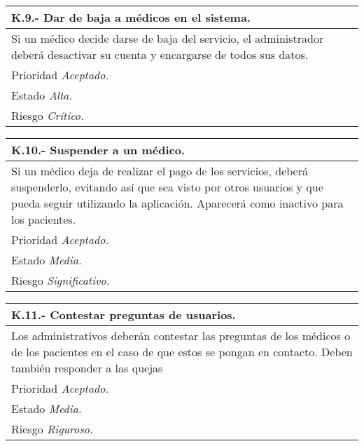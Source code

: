 	\begin{center}
	\begin{tabulary}{15cm}{|L|}
		\hline
			\bf{K.9.- Dar de baja a médicos en el sistema.} \\
		\hline
			Si un médico decide darse de baja del servicio, el administrador deberá desactivar su cuenta y encargarse de todos sus datos. \\
		\hline
			Prioridad \textit{Aceptado.} \\
		\hline
			Estado \textit{Alta.} \\
		\hline
			Riesgo \textit{Crítico.} \\
		\hline
	\end{tabulary}
	\end{center}

	\begin{center}
	\begin{tabulary}{15cm}{|L|}
		\hline
			\bf{K.10.- Suspender a un médico.} \\
		\hline
			Si un médico deja de realizar el pago de los servicios, deberá suspenderlo, evitando así que sea visto por otros usuarios y que pueda seguir utilizando la aplicación. Aparecerá como inactivo para los pacientes. \\
		\hline
			Prioridad \textit{Aceptado.} \\
		\hline
			Estado \textit{Media.} \\
		\hline
			Riesgo \textit{Significativo.} \\
		\hline
	\end{tabulary}
	\end{center}

	\begin{center}
	\begin{tabulary}{15cm}{|L|}
		\hline
			\bf{K.11.- Contestar preguntas de usuarios.} \\
		\hline
			Los administrativos deberán contestar las preguntas de los médicos o de los pacientes en el caso de que estos se pongan en contacto. Deben también responder a las quejas\\
		\hline
			Prioridad \textit{Aceptado.} \\
		\hline
			Estado \textit{Media.} \\
		\hline
			Riesgo \textit{Riguroso.} \\
		\hline
	\end{tabulary}
	\end{center}


